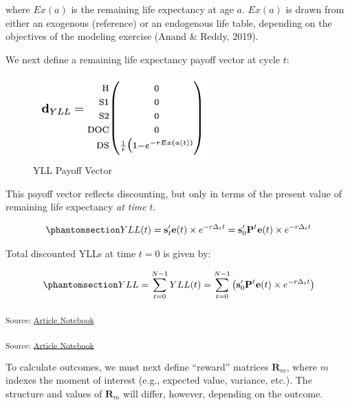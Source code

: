 \documentclass[
]{agujournal2019}
\begin{document}
where \(Ex(a)\) is the remaining life expectancy at age \(a\). \(Ex(a)\)
is drawn from either an exogenous (reference) or an endogenous life
table, depending on the objectives of the modeling exercise (Anand \&
Reddy, 2019).

We next define a remaining life expectancy payoff vector at cycle \(t\):

\begin{figure}[H]

{\centering \includegraphics[width=0.6\textwidth,height=\textheight]{images/d_yll.png}

}

\caption{YLL Payoff Vector}

\end{figure}%

This payoff vector reflects discounting, but only in terms of the
present value of remaining life expectancy \emph{at time} \(t\).

\begin{equation}\phantomsection\label{eq-yllt}{
YLL(t)=\mathbf{s}'_t \mathbf{e}(t)  \times{e^{-r\Delta_t t}} =\mathbf{s}'_0 \mathbf{P}^t \mathbf{e}(t)  \times{e^{-r\Delta_t t}}
}\end{equation}

Total discounted YLLs at time \(t=0\) is given by:

\begin{equation}\phantomsection\label{eq-yllcum}{
YLL=\sum_{t=0}^{N-1} YLL(t) =\sum_{t=0}^{N-1}\left(\mathbf{s}'_0 \mathbf{P}^t \mathbf{e}(t)  \times{e^{-r\Delta_t t}} \right) 
}\end{equation}

\textsubscript{Source:
\href{https://graveja0.github.io/dalys/index.qmd.html}{Article
Notebook}}

\textsubscript{Source:
\href{https://graveja0.github.io/dalys/index.qmd.html}{Article
Notebook}}

To calculate outcomes, we must next define ``reward'' matrices
\(\mathbf{R}_m\), where \(m\) indexes the moment of interest (e.g.,
expected value, variance, etc.). The structure and values of
\(\mathbf{R}_m\) will differ, however, depending on the outcome.
\end{document}
